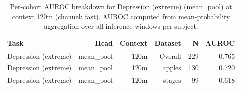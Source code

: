 \begin{table}[ht]
\centering
\caption{Per-cohort AUROC breakdown for Depression (extreme) (mean_pool) at context 120m (channel: fast). AUROC computed from mean-probability aggregation over all inference windows per subject.}
\label{tab:cohort_depression_extreme_binary_mean_pool_fast}
\begin{tabular}{lrrrrr}
\toprule
Task & Head & Context & Dataset & N & AUROC \\
\midrule
Depression (extreme) & mean_pool & 120m & Overall & 229 & 0.765 \\
Depression (extreme) & mean_pool & 120m & apples & 130 & 0.720 \\
Depression (extreme) & mean_pool & 120m & stages & 99 & 0.618 \\
\bottomrule
\end{tabular}
\end{table}